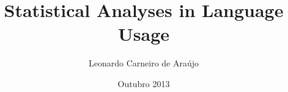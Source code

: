 \author{Leonardo Carneiro de Ara\'ujo}
\title{Statistical Analyses in Language Usage}
\date{Outubro 2013}
\maketitle

% 
% 
% 
% 
% 
% 
% 
% 
% 
% 
% 
% 

